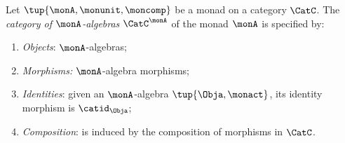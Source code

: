 \begin{ctdefinition}
    \label{def:catofmonadalgebras}
    Let $\tup{\monA, \monunit, \moncomp}$ be a monad on a category $\CatC$.
    The \emph{category of $\monA$-algebras} $\CatC^\monA$ of the monad $\monA$ is specified by:
    \begin{enumerate}
        \item \emph{Objects}: $\monA$-algebras;
        \item \emph{Morphisms:} $\monA$-algebra morphisms;
        \item \emph{Identities}: given an $\monA$-algebra $\tup{\Obja, \monact}$, its identity morphism is $\catid_\Obja$;
        \item \emph{Composition}: is induced by the composition of morphisms in $\CatC$.
    \end{enumerate}
\end{ctdefinition}

